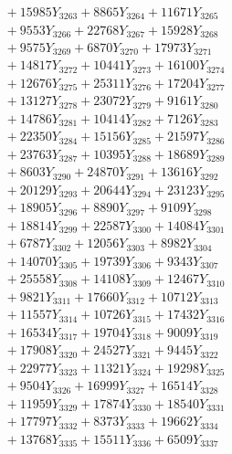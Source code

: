 \documentclass[a4paper,10pt]{article}
\begin{document}
{\begin{align}
&\;  + 15985 Y_{3263} + 8865 Y_{3264} + 11671 Y_{3265} \\[0.3ex]
&\;  + 9553 Y_{3266} + 22768 Y_{3267} + 15928 Y_{3268} \\[0.5ex]\allowbreak
&\;  + 9575 Y_{3269} + 6870 Y_{3270} + 17973 Y_{3271} \\[0.3ex]
&\;  + 14817 Y_{3272} + 10441 Y_{3273} + 16100 Y_{3274} \\[0.3ex]
&\;  + 12676 Y_{3275} + 25311 Y_{3276} + 17204 Y_{3277} \\[0.3ex]
&\;  + 13127 Y_{3278} + 23072 Y_{3279} + 9161 Y_{3280} \\[0.3ex]
&\;  + 14786 Y_{3281} + 10414 Y_{3282} + 7126 Y_{3283} \\[0.3ex]
&\;  + 22350 Y_{3284} + 15156 Y_{3285} + 21597 Y_{3286} \\[0.3ex]
&\;  + 23763 Y_{3287} + 10395 Y_{3288} + 18689 Y_{3289} \\[0.3ex]
&\;  + 8603 Y_{3290} + 24870 Y_{3291} + 13616 Y_{3292} \\[0.3ex]
&\;  + 20129 Y_{3293} + 20644 Y_{3294} + 23123 Y_{3295} \\[0.3ex]
&\;  + 18905 Y_{3296} + 8890 Y_{3297} + 9109 Y_{3298} \\[0.5ex]\allowbreak
&\;  + 18814 Y_{3299} + 22587 Y_{3300} + 14084 Y_{3301} \\[0.3ex]
&\;  + 6787 Y_{3302} + 12056 Y_{3303} + 8982 Y_{3304} \\[0.3ex]
&\;  + 14070 Y_{3305} + 19739 Y_{3306} + 9343 Y_{3307} \\[0.3ex]
&\;  + 25558 Y_{3308} + 14108 Y_{3309} + 12467 Y_{3310} \\[0.3ex]
&\;  + 9821 Y_{3311} + 17660 Y_{3312} + 10712 Y_{3313} \\[0.3ex]
&\;  + 11557 Y_{3314} + 10726 Y_{3315} + 17432 Y_{3316} \\[0.3ex]
&\;  + 16534 Y_{3317} + 19704 Y_{3318} + 9009 Y_{3319} \\[0.3ex]
&\;  + 17908 Y_{3320} + 24527 Y_{3321} + 9445 Y_{3322} \\[0.3ex]
&\;  + 22977 Y_{3323} + 11321 Y_{3324} + 19298 Y_{3325} \\[0.3ex]
&\;  + 9504 Y_{3326} + 16999 Y_{3327} + 16514 Y_{3328} \\[0.5ex]\allowbreak
&\;  + 11959 Y_{3329} + 17874 Y_{3330} + 18540 Y_{3331} \\[0.3ex]
&\;  + 17797 Y_{3332} + 8373 Y_{3333} + 19662 Y_{3334} \\[0.3ex]
&\;  + 13768 Y_{3335} + 15511 Y_{3336} + 6509 Y_{3337} \\[0.3ex]

\end{align}}
\end{document}
